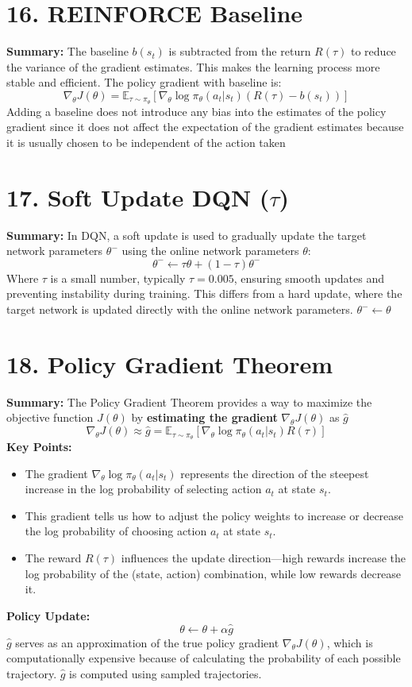 \documentclass[a4paper,10pt]{article}
\begin{document}
\begin{multicols}{2}
\section*{16. REINFORCE Baseline}
\textbf{Summary:} The baseline \( b(s_t) \) is subtracted from the return \( R(\tau) \) to reduce the variance of the gradient estimates. This makes the learning process more stable and efficient. The policy gradient with baseline is:
\[
\nabla_\theta J(\theta) = \mathbb{E}_{\tau \sim \pi_\theta} \left[ \nabla_\theta \log \pi_\theta(a_t | s_t) (R(\tau) - b(s_t)) \right]
\]
Adding a baseline does not introduce any bias into the estimates of the policy gradient since it does not affect the expectation of the gradient estimates because it is usually chosen to be independent of the action taken

\section*{17. Soft Update DQN (\(\tau\))}
\textbf{Summary:} In DQN, a soft update is used to gradually update the target network parameters \( \theta^- \) using the online network parameters \( \theta \):
\[
\theta^- \leftarrow \tau \theta + (1 - \tau) \theta^-
\]
Where \( \tau \) is a small number, typically \( \tau = 0.005 \), ensuring smooth updates and preventing instability during training. This differs from a hard update, where the target network is updated directly with the online network parameters. \( \theta^- \leftarrow \theta \)

\section*{18. Policy Gradient Theorem}
\textbf{Summary:} The Policy Gradient Theorem provides a way to maximize the objective function \( J(\theta) \) by \textbf{estimating the gradient} \( \nabla_\theta J(\theta) \) as \( \hat{g} \)
\[
\nabla_\theta J(\theta) \approx \hat{g} = \mathbb{E}_{\tau \sim \pi_\theta} \left[ \nabla_\theta \log \pi_\theta(a_t | s_t) R(\tau) \right]
\]
\textbf{Key Points:}
\begin{itemize}
    \item The gradient \( \nabla_\theta \log \pi_\theta(a_t | s_t) \) represents the direction of the steepest increase in the log probability of selecting action \( a_t \) at state \( s_t \).
    \item This gradient tells us how to adjust the policy weights to increase or decrease the log probability of choosing action \( a_t \) at state \( s_t \).
    \item The reward \( R(\tau) \) influences the update direction—high rewards increase the log probability of the (state, action) combination, while low rewards decrease it.
\end{itemize}
\textbf{Policy Update:}
\[
\theta \leftarrow \theta + \alpha \hat{g}
\]
\( \hat{g} \) serves as an approximation of the true policy gradient \( \nabla_\theta J(\theta) \), which is computationally expensive because of calculating the probability of each possible trajectory. \( \hat{g} \) is computed using sampled trajectories.

\end{multicols}
\end{document}
